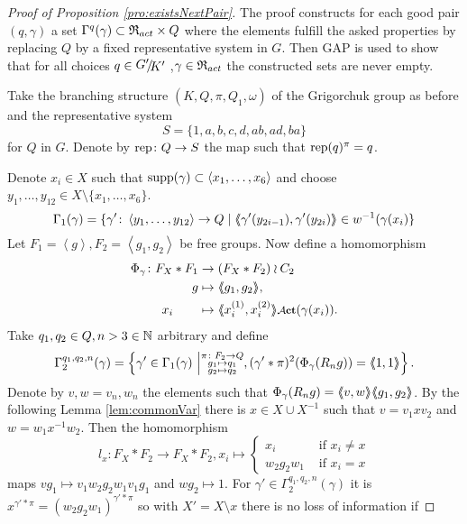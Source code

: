 \documentclass[a4paper,12pt]{article}
\begin{document}
\begin{proof}[Proof of Proposition \ref{pro:existsNextPair}]
 The proof constructs for each good pair $(q,\gamma)$ a set $\Gamma^q(\gamma)\subset \mathfrak{R}_{act}\times Q$ where the elements 
 fulfill the asked properties by replacing $Q$ by a fixed representative system in $G$.
 Then GAP is used to show that for all choices $q\in\RNK{G'}{K'}$,$\gamma\in\mathfrak{R}_{act}$ the  constructed sets are never empty.
 \smallskip
 
 Take the branching structure $(K,Q,\pi,Q_1,\omega)$ of the Grigorchuk group as before and the representative system
 \[S=\{1,a,b,c,d,ab,ad,ba\}\] for $Q$ in $G$. Denote by $\textup{rep}\colon Q\to S$ 
 the map such that $\textup{rep}(q)^\pi = q$.
 
 Denote $x_i\in X$ such that $\textup{supp}(\gamma) \subset \left<x_1,\ldots,x_6\right>$ and choose $y_1,\ldots,y_{12} \in X \setminus \{x_1,\ldots,x_6\}$.  
 \[\Gamma_1(\gamma) = \{\gamma' \colon \left< y_1,\ldots ,y_{12}\right> \to Q \mid \langle\negthickspace\langle\gamma'(y_{2i-1}),\gamma'(y_{2i})\rangle\negthickspace\rangle\in w^{-1}(\gamma(x_i)\}\] 
 Let $F_1=\left<g\right>,F_2=\left<g_1,g_2\right>$ be free groups. 
 Now define a homomorphism 
 \begin{align*}
  \Phi_{\gamma}\colon F_X*F_1 &\to (F_X*F_2)\wr C_2 \\ g&\mapsto \pair{g_1,g_2},\\ x_i\qquad &\mapsto \pair{x_i^{(1)},x_i^{(2)}}\act(\gamma(x_i)).
 \end{align*}
Take $q_1,q_2 \in Q,n>3\in \mathbb{N}$ arbitrary and define
 \[\Gamma_2^{q_1,q_2,n}(\gamma) = \left\{\gamma'\in \Gamma_1(\gamma) \ \middle \vert \substack{\pi\colon F_2\to Q\\
										g_1\mapsto q_1 \\
										g_2\mapsto q_2 }, (\gamma'*\pi)^2(\Phi_\gamma(R_ng))=\langle\negthickspace\langle1,1\rangle\negthickspace\rangle\right\}.\] 
 Denote by $v,w=v_n,w_n$ the elements such that $\Phi_\gamma(R_ng)=\langle\negthickspace\langle v,w\rangle\negthickspace\rangle\langle\negthickspace\langle g_1,g_2\rangle\negthickspace\rangle$. By the following Lemma \ref{lem:commonVar} there is 
 $x \in X\cup X^{-1}$ such that $v=v_1xv_2$ and $w=w_1x^{-1}w_2$. Then the homomorphism
 \[l_x\colon F_X*F_2\to F_X*F_2, x_i \mapsto \begin{cases}
						x_i &\text{ if } x_i\neq x \\
						w_2g_2w_1 &\text{ if }x_i= x 
                                             \end{cases}\]
 maps $vg_1 \mapsto v_1w_2g_2w_1v_1g_1$ and $wg_2\mapsto 1$. 
 For $\gamma'\in \Gamma_2^{q_1,q_2,n}(\gamma)$ it is $x^{\gamma'*\pi}=(w_2g_2w_1)^{\gamma'*\pi}$ so with $X'=X\setminus x$ there is no loss of information if 

\end{proof}
\end{document}
